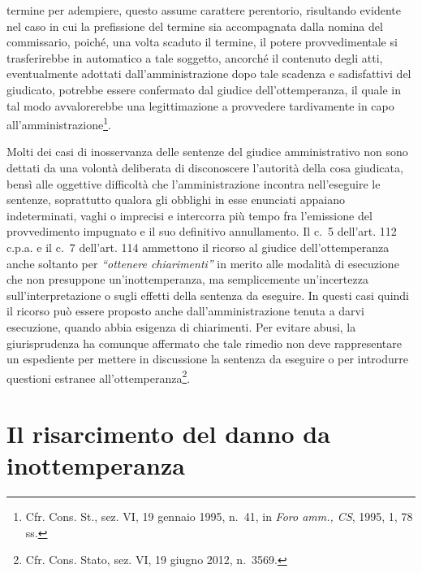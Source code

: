 \documentclass[12pt,it,a4paper,]{report}
\begin{document}
termine per adempiere, questo assume carattere perentorio, risultando
evidente nel caso in cui la prefissione del termine sia accompagnata
dalla nomina del commissario, poiché, una volta scaduto il termine, il
potere provvedimentale si trasferirebbe in automatico a tale soggetto,
ancorché il contenuto degli atti, eventualmente adottati
dall'amministrazione dopo tale scadenza e sadisfattivi del giudicato,
potrebbe essere confermato dal giudice dell'ottemperanza, il quale in
tal modo avvalorerebbe una legittimazione a provvedere tardivamente in
capo all'amministrazione\footnote{Cfr. Cons. St., sez. VI, 19 gennaio
  1995, n.~41, in \emph{Foro amm., CS}, 1995, 1, 78 ss.}.

Molti dei casi di inosservanza delle sentenze del giudice amministrativo
non sono dettati da una volontà deliberata di disconoscere l'autorità
della cosa giudicata, bensì alle oggettive difficoltà che
l'amministrazione incontra nell'eseguire le sentenze, soprattutto
qualora gli obblighi in esse enunciati appaiano indeterminati, vaghi o
imprecisi e intercorra più tempo fra l'emissione del provvedimento
impugnato e il suo definitivo annullamento. Il c.~5 dell'art. 112 c.p.a.
e il c.~7 dell'art. 114 ammettono il ricorso al giudice
dell'ottemperanza anche soltanto per \emph{``ottenere chiarimenti''} in
merito alle modalità di esecuzione che non presuppone un'inottemperanza,
ma semplicemente un'incertezza sull'interpretazione o sugli effetti
della sentenza da eseguire. In questi casi quindi il ricorso può essere
proposto anche dall'amministrazione tenuta a darvi esecuzione, quando
abbia esigenza di chiarimenti. Per evitare abusi, la giurisprudenza ha
comunque affermato che tale rimedio non deve rappresentare un espediente
per mettere in discussione la sentenza da eseguire o per introdurre
questioni estranee all'ottemperanza\footnote{Cfr. Cons. Stato, sez. VI,
  19 giugno 2012, n.~3569.}.

\hypertarget{il-risarcimento-del-danno-da-inottemperanza}{%
\section{Il risarcimento del danno da
inottemperanza}\label{il-risarcimento-del-danno-da-inottemperanza}}
\end{document}
